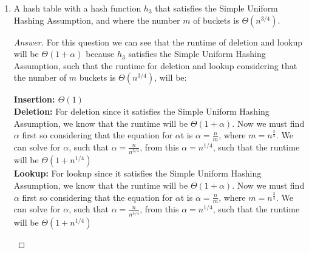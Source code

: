 \documentclass[11pt]{article}
\theoremstyle{definition}
\theoremstyle{definition}
\theoremstyle{definition}
\begin{document}
\begin{enumerate}[label=(\alph*)]
    \vskip 15pt	
    \item A hash table with a hash function $h_3$ that satisfies the Simple Uniform Hashing Assumption, and where the number $m$ of buckets is $\Theta(n^{3/4})$.
    \begin{proof}[Answer]
        For this question we can see that the runtime of deletion and lookup will be $\Theta(1+\alpha)$ because $h_3$ satisfies the Simple Uniform Hashing Assumption, such that the runtime for deletion and lookup considering that the number of $m$ buckets is $\Theta(n^{3/4})$, will be: \\
        \begin{center}
        \textbf{Insertion: $\Theta(1)$} \\
        \textbf{Deletion:} For deletion since it satisfies the Simple Uniform Hashing Assumption, we know that the runtime will be $\Theta(1+\alpha)$. Now we must find $\alpha$ first so considering that the equation for $\alpha$t is $\alpha = \frac{n}{m}$, where $m = n^{\frac{3}{4}}$. We can solve for $\alpha$, such that $\alpha = \frac{n}{n^{3/4}}$, from this $\alpha = n^{1/4}$, such that the runtime will be $\Theta(1+ n^{1/4})$ \\
        \textbf{Lookup: } For lookup since it satisfies the Simple Uniform Hashing Assumption, we know that the runtime will be $\Theta(1+\alpha)$. Now we must find $\alpha$ first so considering that the equation for $\alpha$t is $\alpha = \frac{n}{m}$, where $m = n^{\frac{3}{4}}$. We can solve for $\alpha$, such that $\alpha = \frac{n}{n^{3/4}}$, from this $\alpha =  n^{1/4}$, such that the runtime will be $\Theta(1+ n^{1/4})$ \\
        \end{center}
        

\end{proof}
\end{enumerate}
\end{document}

